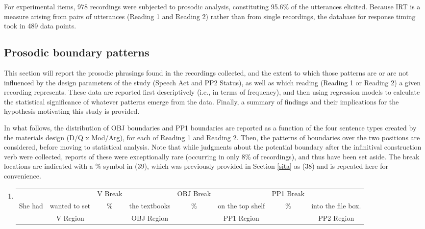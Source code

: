 \documentclass[11pt,oneside]{book}
\providecommand{\tightlist}{%
  \setlength{\itemsep}{0pt}\setlength{\parskip}{0pt}}
\begin{document}
For experimental items, 978 recordings were subjected to prosodic analysis, constituting 95.6\% of the utterances elicited. Because IRT is a measure arising from pairs of utterances (Reading 1 and Reading 2) rather than from single recordings, the database for response timing took in 489 data points.

\hypertarget{results-prosody}{%
\subsection{Prosodic boundary patterns}\label{results-prosody}}

This section will report the prosodic phrasings found in the recordings collected, and the extent to which those patterns are or are not influenced by the design parameters of the study (Speech Act and PP2 Status), as well as which reading (Reading 1 or Reading 2) a given recording represents. These data are reported first descriptively (i.e., in terms of frequency), and then using regression models to calculate the statistical significance of whatever patterns emerge from the data. Finally, a summary of findings and their implications for the hypothesis motivating this study is provided.

In what follows, the distribution of OBJ boundaries and PP1 boundaries are reported as a function of the four sentence types created by the materials design (D/Q x Mod/Arg), for each of Reading 1 and Reading 2. Then, the patterns of boundaries over the two positions are considered, before moving to statistical analysis. Note that while judgments about the potential boundary after the infinitival construction verb were collected, reports of these were exceptionally rare (occurring in only 8\% of recordings), and thus have been set aside. The break locations are indicated with a \% symbol in (39), which was previously provided in Section \ref{sita} as (38) and is repeated here for convenience.

\begin{enumerate}
\def\labelenumi{(\arabic{enumi})}
\setcounter{enumi}{38}
\tightlist
\item
  \begingroup
  \setlength{\tabcolsep}{1pt}

  \begin{tabular}{cccccccc}
    & & \footnotesize V Break & & \footnotesize OBJ Break & & \footnotesize PP1 Break & \\
    She had & wanted to set & \% & the textbooks & \% & on the top shelf & \% & into the file box. \\
    \cmidrule(r){2-2} \cmidrule(r){4-4} \cmidrule(r){6-6} \cmidrule(r){8-8} 
    & \footnotesize V Region & & \footnotesize OBJ Region & & \footnotesize PP1 Region & & PP2 Region \\
  \end{tabular}
    \endgroup
\end{enumerate}
\end{document}
